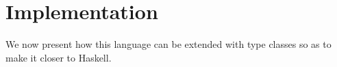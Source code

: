 \chapter{Implementation}
\label{cha:8}
We now present how this language can be extended with type classes so as to make it closer to Haskell.
